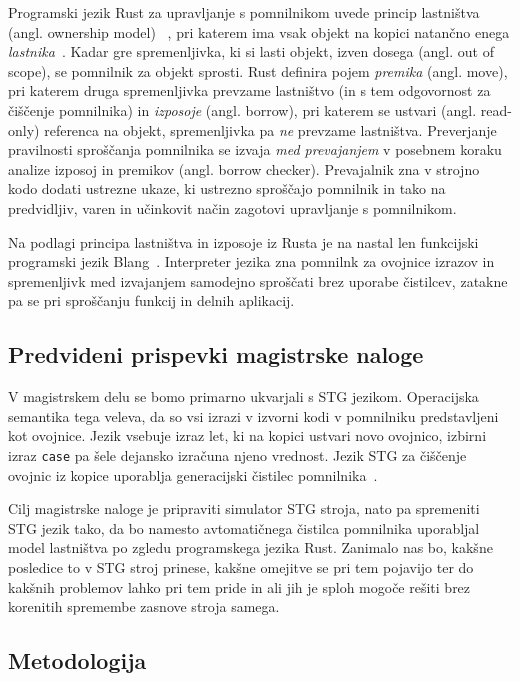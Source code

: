 \documentclass[a4paper, 12pt]{article}
\begin{document}
Programski jezik Rust za upravljanje s pomnilnikom uvede princip lastništva (angl. ownership model) ~\cite{klabnik2023rust}, pri katerem ima vsak objekt na kopici natančno enega \textit{lastnika}~\cite{Jung, Oxide, StackedBorrows}. Kadar gre spremenljivka, ki si lasti objekt, izven dosega (angl. out of scope), se pomnilnik za objekt sprosti. Rust definira pojem \textit{premika} (angl. move), pri katerem druga spremenljivka prevzame lastništvo (in s tem odgovornost za čiščenje pomnilnika) in \textit{izposoje} (angl. borrow), pri katerem se ustvari (angl. read-only) referenca na objekt, spremenljivka pa \textit{ne} prevzame lastništva. Preverjanje pravilnosti sproščanja pomnilnika se izvaja \textit{med prevajanjem} v posebnem koraku analize izposoj in premikov (angl. borrow checker). Prevajalnik zna v strojno kodo dodati ustrezne ukaze, ki ustrezno sproščajo pomnilnik in tako na predvidljiv, varen in učinkovit način zagotovi upravljanje s pomnilnikom.

Na podlagi principa lastništva in izposoje iz Rusta je na nastal len funkcijski programski jezik Blang~\cite{Kocjan_Turk_2022}. Interpreter jezika zna pomnilnk za ovojnice izrazov in spremenljivk med izvajanjem samodejno sproščati brez uporabe čistilcev, zatakne pa se pri sproščanju funkcij in delnih aplikacij.

\subsection{Predvideni prispevki magistrske naloge}

V magistrskem delu se bomo primarno ukvarjali s STG jezikom. Operacijska semantika tega veleva, da so vsi izrazi v izvorni kodi v pomnilniku predstavljeni kot ovojnice. Jezik vsebuje izraz let, ki na kopici ustvari novo ovojnico, izbirni izraz \texttt{case} pa šele dejansko izračuna njeno vrednost. Jezik STG za čiščenje ovojnic iz kopice uporablja generacijski čistilec pomnilnika~\cite{jones1992implementing, marlow2004making}. 

Cilj magistrske naloge je pripraviti simulator STG stroja, nato pa spremeniti STG jezik tako, da bo namesto avtomatičnega čistilca pomnilnika uporabljal model lastništva po zgledu programskega jezika Rust. Zanimalo nas bo, kakšne posledice to v STG stroj prinese, kakšne omejitve se pri tem pojavijo ter do kakšnih problemov lahko pri tem pride in ali jih je sploh mogoče rešiti brez korenitih spremembe zasnove stroja samega.

\subsection{Metodologija}
\end{document}
